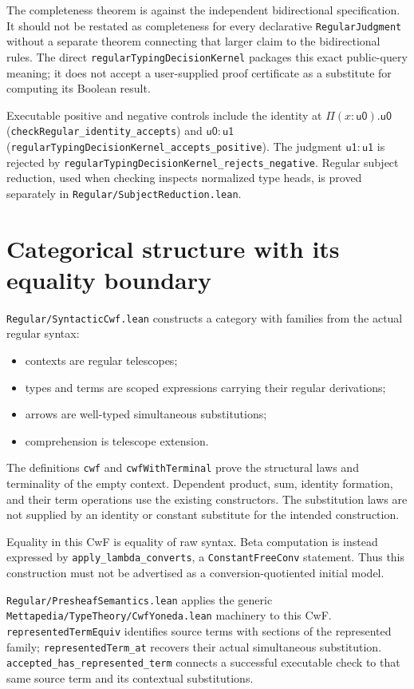 \documentclass[11pt]{article}
\newcommand{\code}[1]{\nolinkurl{#1}}
\newcommand{\uZ}{\mathsf{u0}}
\newcommand{\uO}{\mathsf{u1}}
\begin{document}
The completeness theorem is against the independent bidirectional
specification. It should not be restated as completeness for every
declarative \code{RegularJudgment} without a separate theorem connecting
that larger claim to the bidirectional rules.
The direct \code{regularTypingDecisionKernel} packages this exact
public-query meaning; it does not accept a user-supplied proof certificate
as a substitute for computing its Boolean result.

Executable positive and negative controls include the identity at
$\Pi(x:\uZ).\uZ$ (\code{checkRegular_identity_accepts}) and $\uZ:\uO$
(\code{regularTypingDecisionKernel_accepts_positive}). The judgment
$\uO:\uO$ is rejected by
\code{regularTypingDecisionKernel_rejects_negative}.
Regular subject reduction, used when checking inspects normalized type
heads, is proved separately in \code{Regular/SubjectReduction.lean}.

\section{Categorical structure with its equality boundary}
\label{sec:cwf}

\code{Regular/SyntacticCwf.lean} constructs a category with families from
the actual regular syntax:
\begin{itemize}[nosep]
  \item contexts are regular telescopes;
  \item types and terms are scoped expressions carrying their regular
  derivations;
  \item arrows are well-typed simultaneous substitutions;
  \item comprehension is telescope extension.
\end{itemize}
The definitions \code{cwf} and \code{cwfWithTerminal} prove the structural
laws and terminality of the empty context.
Dependent product, sum, identity formation, and their term operations use
the existing constructors. The substitution laws are not supplied by an
identity or constant substitute for the intended construction.

Equality in this CwF is equality of raw syntax.
Beta computation is instead expressed by
\code{apply_lambda_converts}, a \code{ConstantFreeConv} statement.
Thus this construction must not be advertised as a conversion-quotiented
initial model.

\code{Regular/PresheafSemantics.lean} applies the generic
\code{Mettapedia/TypeTheory/CwfYoneda.lean} machinery to this CwF.
\code{representedTermEquiv} identifies source terms with sections of the
represented family; \code{representedTerm_at} recovers their actual
simultaneous substitution.
\code{accepted_has_represented_term} connects a successful executable
check to that same source term and its contextual substitutions.
\end{document}
